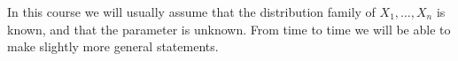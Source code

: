\documentclass[a4paper]{scrartcl}
\begin{document}
In this course we will usually assume that the distribution family of $X_1, \dots, X_n$ is known, and that the parameter is unknown. From time to time we will be able to make slightly more general statements.








\end{document}
